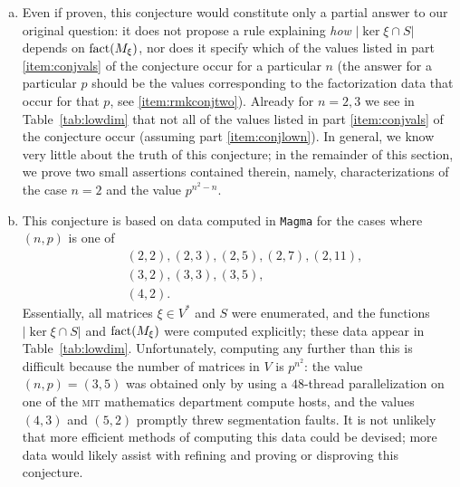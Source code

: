 \begin{rem}\hfill
\label{rem:conj}
\begin{enumerate}[(a)]
\item Even if proven, this conjecture would constitute only a partial answer to our original question: it does not propose a rule explaining \emph{how} $|\ker\xi\cap S|$ depends on $\operatorname{fact}(M_\xi)$, nor does it specify which of the values listed in part \eqref{item:conjvals} of the conjecture occur for a particular $n$ (the answer for a particular $p$ should be the values corresponding to the factorization data that occur for that $p$, see \eqref{item:rmkconjtwo}). Already for $n=2,3$ we see in Table~\ref{tab:lowdim} that not all of the values listed in part \eqref{item:conjvals} of the conjecture occur (assuming part \eqref{item:conjlown}). In general, we know very little about the truth of this conjecture; in the remainder of this section, we prove two small assertions contained therein, namely, characterizations of the case $n=2$ and the value $p^{n^2-n}$.
\item This conjecture is based on data computed in \texttt{Magma} \cite{magma} for the cases where $(n,p)$ is one of
\begin{align*}
&(2,2),(2,3),(2,5),(2,7),(2,11),\\
&(3,2),(3,3),(3,5),\\
&(4,2).
\end{align*}
Essentially, all matrices $\xi\in V^*$ and $S$ were enumerated, and the functions $|\ker\xi\cap S|$ and $\operatorname{fact}(M_\xi)$ were computed explicitly; these data appear in Table~\ref{tab:lowdim}. Unfortunately, computing any further than this is difficult because the number of matrices in $V$ is $p^{n^2}$: the value $(n,p)=(3,5)$ was obtained only by using a $48$-thread parallelization on one of the \textsc{mit} mathematics department compute hosts, and the values $(4,3)$ and $(5,2)$ promptly threw segmentation faults. It is not unlikely that more efficient methods of computing this data could be devised; more data would likely assist with refining and proving or disproving this conjecture.\label{item:rmkconjone}


\end{enumerate}
\end{rem}
